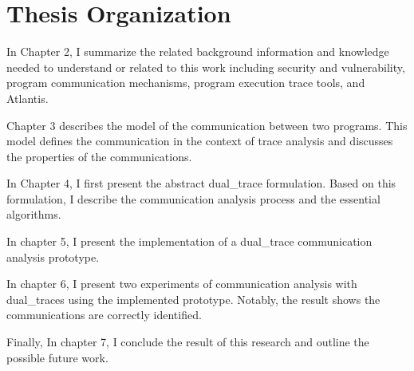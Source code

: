 \section{Thesis Organization}
In Chapter 2, I summarize the related background information and knowledge needed to understand or related to this work including security and vulnerability, program communication mechanisms, program execution trace tools, and Atlantis. 

Chapter 3 describes the model of the communication between two programs. This model defines the communication in the context of trace analysis and discusses the properties of the communications. 

In Chapter 4, I first present the abstract dual\_trace formulation. Based on this formulation, I describe the communication analysis process and the essential algorithms.

In chapter 5, I present the implementation of a dual\_trace communication analysis prototype. 

In chapter 6, I present two experiments of communication analysis with dual\_traces using the implemented prototype. Notably, the result shows the communications are correctly identified. 

Finally, In chapter 7, I conclude the result of this research and outline the possible future work.